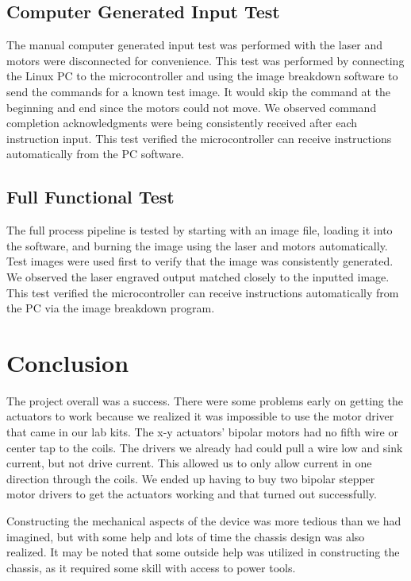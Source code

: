 \documentclass[11pt]{LaTeX-Classes/math-hw}
\begin{document}
\subsection{Computer Generated Input Test}
The manual computer generated input test was performed with
the laser and motors were disconnected for convenience. This test was performed by
connecting the Linux PC to the microcontroller and using the image breakdown software to send the commands for
a known test image. It would skip the  command at the beginning and end since the motors
could not move.
We observed command completion acknowledgments were being consistently received after each instruction input.
This test verified the microcontroller can receive instructions automatically from the PC software.

\subsection{Full Functional Test}
The full process pipeline is tested by starting with an image file, loading it into the software,
and burning the image using the laser and motors automatically.
Test images were used first to verify that the image was consistently generated. We observed the laser engraved output matched closely to the inputted image. This test verified the microcontroller can receive instructions automatically from the PC via the image breakdown program.

\section{Conclusion}
The project overall was a success. There were some problems early on getting the actuators to work because we realized it was impossible to use the motor driver that came in our lab kits.
The x-y actuators' bipolar motors had no fifth wire or center tap to the coils.
The drivers we already had could pull a wire low and sink current, but not drive current.
This allowed us to only allow current in one direction through the coils.
We ended up having to buy two bipolar stepper motor drivers to get the actuators working and that turned out successfully.

Constructing the mechanical aspects of the device was more tedious than we had imagined,
but with some help and lots of time the chassis design was also realized. 
It may be noted that some outside help was utilized in constructing the chassis,
as it required some skill with access to power tools.
\end{document}
